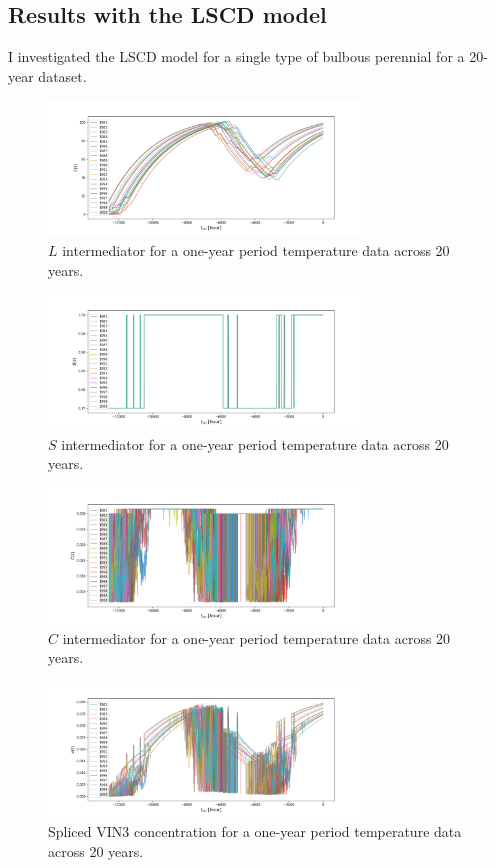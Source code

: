 \documentclass[11pt, a4paper]{article}
\begin{document}
\subsection*{Results with the LSCD model}
I investigated the LSCD model for a single type of bulbous perennial for a 20-year dataset. 
\begin{figure}[H]
    \centering
    \includegraphics[width=0.75\textwidth]{images/L_plot.png}
    \caption{$L$ intermediator for a one-year period temperature data across 20 years.}
\end{figure}
\begin{figure}[H]
    \centering
    \includegraphics[width=0.75\textwidth]{images/S_plot.png}
    \caption{$S$ intermediator for a one-year period temperature data across 20 years.}
\end{figure}
\begin{figure}[H]
    \centering
    \includegraphics[width=0.75\textwidth]{images/C_plot.png}
    \caption{$C$ intermediator for a one-year period temperature data across 20 years.}
\end{figure}
\begin{figure}[H]
    \centering
    \includegraphics[width=0.75\textwidth]{images/nu_plot.png}
    \caption{Spliced VIN3 concentration for a one-year period temperature data across 20 years.}
\end{figure}
\end{document}
